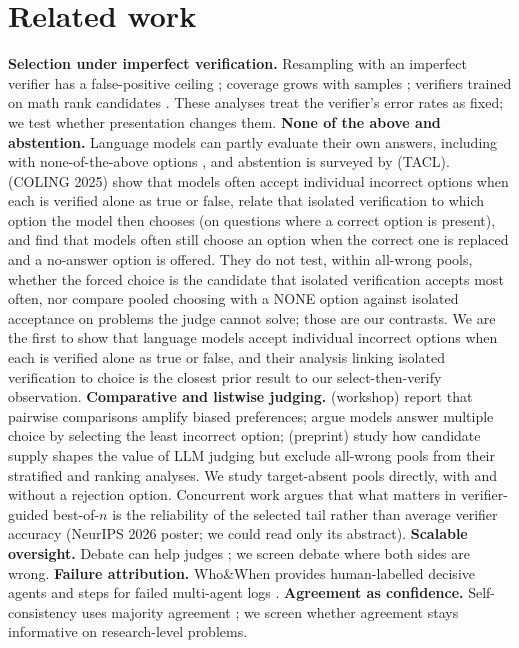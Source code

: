 \documentclass[10pt,twocolumn]{article}
\begin{document}
\section{Related work}
\textbf{Selection under imperfect verification.} Resampling with an imperfect verifier has a false-positive ceiling \citep{stroebl2026limits}; coverage grows with samples \citep{brown2024large}; verifiers trained on math rank candidates \citep{cobbe2021training,lightman2024lets}. These analyses treat the verifier's error rates as fixed; we test whether presentation changes them.
\textbf{None of the above and abstention.} Language models can partly evaluate their own answers, including with none-of-the-above options \citep{kadavath2022language}, and abstention is surveyed by \citet{wen2024know} (TACL). \citet{wang2025llms} (COLING 2025) show that models often accept individual incorrect options when each is verified alone as true or false, relate that isolated verification to which option the model then chooses (on questions where a correct option is present), and find that models often still choose an option when the correct one is replaced and a no-answer option is offered. They do not test, within all-wrong pools, whether the forced choice is the candidate that isolated verification accepts most often, nor compare pooled choosing with a NONE option against isolated acceptance on problems the judge cannot solve; those are our contrasts. We are the first to show that language models accept individual incorrect options when each is verified alone as true or false, and their analysis linking isolated verification to choice is the closest prior result to our select-then-verify observation. \textbf{Comparative and listwise judging.} \citet{jeong2025comparative} (workshop) report that pairwise comparisons amplify biased preferences; \citet{wang2025llms} argue models answer multiple choice by selecting the least incorrect option; \citet{ji2026candidate} (preprint) study how candidate supply shapes the value of LLM judging but exclude all-wrong pools from their stratified and ranking analyses. We study target-absent pools directly, with and without a rejection option.
Concurrent work argues that what matters in verifier-guided best-of-$n$ is the reliability of the selected tail rather than average verifier accuracy \citep{zhang2026selected} (NeurIPS 2026 poster; we could read only its abstract). \textbf{Scalable oversight.} Debate can help judges \citep{irving2018ai,khan2024debating,kenton2024scalable}; we screen debate where both sides are wrong. \textbf{Failure attribution.} Who\&When provides human-labelled decisive agents and steps for failed multi-agent logs \citep{zhang2025which}. \textbf{Agreement as confidence.} Self-consistency uses majority agreement \citep{wang2023self}; we screen whether agreement stays informative on research-level problems.
\end{document}
